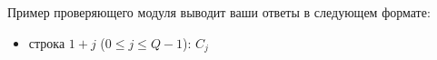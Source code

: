 Пример проверяющего модуля выводит ваши ответы в следующем формате:
\begin{itemize}
    \item строка $1 + j$ ($0 \le j \le Q-1$): $C_j$
\end{itemize}


